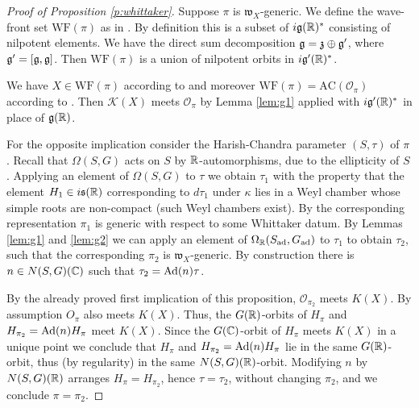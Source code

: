 \documentclass{article}
\theoremstyle{definition}
\numberwithin{equation}{section}
\renewcommand{\-}{\hyp{}}
\newcommand{\warn}[1]{{\leavevmode\color{red}[#1]}}
\newcommand{\g}{\mathfrak g}
\renewcommand{\O}{\mathcal O}
\newcommand{\K}{\mathcal K}
\newcommand{\w}{\mathfrak w}
\newcommand{\WF}{\mathrm{WF}}
\newcommand{\AC}{\mathrm{AC}}
\begin{document}
\begin{proof}[Proof of Proposition \ref{p:whittaker}]

Suppose $\pi$ is $\w_X$-generic.
	We define the wave-front set $\WF(\pi)$ as in \cite[Section 3]{matumoto}. By definition this is a subset of $i\g(\R)^*$ consisting of nilpotent elements. We have the direct sum decomposition $\g = \mf{z} \oplus \mf{g}'$, where $\mathfrak{g}'=[\mathfrak{g},\mathfrak{g}]$. Then $\WF(\pi)$ is a union of nilpotent orbits in $i\g'(\R)^*$.

We have $X\in \WF(\pi)$ according to \cite[Theorem A]{matumoto} and moreover $\WF(\pi)=\AC(\O_\pi)$ according to \cite[Theorem 1.2]{harris}.
Then $\K(X)$ meets $\O_\pi$ by 
Lemma \ref{lem:g1} applied with $i\g'(\R)^*$ in place of $\g(\R)$.

For the opposite implication consider the Harish-Chandra parameter $(S,\tau)$ of $\pi$. Recall that $\Omega(S,G)$ acts on $S$ by $\mathbb{R}$-automorphisms, due to the ellipticity of $S$. Applying an element of $\Omega(S,G)$ to $\tau$ we obtain $\tau_1$ with the property that the element $H_1 \in i\mathfrak{s}(\mathbb{R})$ corresponding to $d\tau_1$ under $\kappa$ lies in a Weyl chamber whose simple roots are non-compact (such Weyl chambers exist). By \cite[Theorem 6.2(a,f)]{Vog78} the corresponding representation $\pi_1$ is generic with respect to some Whittaker datum. By Lemmas \ref{lem:g1} and \ref{lem:g2} we can apply an element of $\Omega_{\mathbb{R}}(S_{\textrm{ad}},G_{\textrm{ad}})$ to $\tau_1$ to obtain $\tau_2$, such that the corresponding $\pi_2$ is $\w_X$-generic. By construction there is $n \in N(S,G)(\mathbb{C})$ such that $\tau_2=\textrm{Ad}(n)\tau$.

By the already proved first implication of this proposition, $\O_{\pi_2}$ meets $K(X)$. By assumption $O_\pi$ also meets $K(X)$. Thus, the $G(\mathbb{R})$-orbits of $H_\pi$ and $H_{\pi_2}=\textrm{Ad}(n)H_\pi$ meet $K(X)$. Since the $G(\mathbb{C})$-orbit of $H_\pi$ meets $K(X)$ in a unique point we conclude that $H_\pi$ and $H_{\pi_2}=\textrm{Ad}(n)H_\pi$ lie in the same $G(\mathbb{R})$-orbit, thus (by regularity) in the same $N(S,G)(\mathbb{R})$-orbit. Modifying $n$ by $N(S,G)(\mathbb{R})$ arranges $H_\pi=H_{\pi_2}$, hence $\tau=\tau_2$, without changing $\pi_2$, and we conclude $\pi=\pi_2$.
%
\end{proof}
\end{document}

